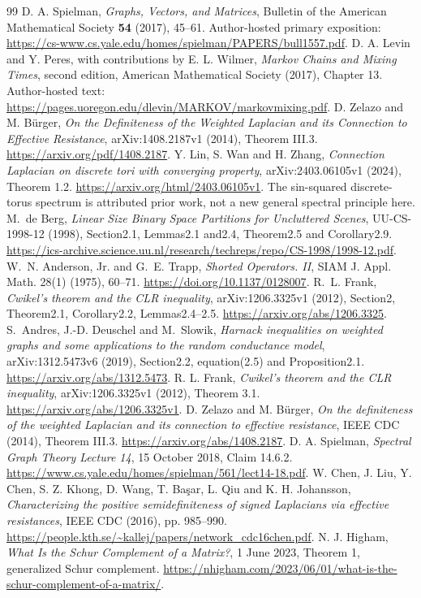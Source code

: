\documentclass[11pt]{article}
\begin{document}
\begin{thebibliography}{99}
 D. A. Spielman, \emph{Graphs, Vectors, and Matrices},
Bulletin of the American Mathematical Society \textbf{54} (2017), 45--61.
Author-hosted primary exposition:
\url{https://cs-www.cs.yale.edu/homes/spielman/PAPERS/bull1557.pdf}.
 D. A. Levin and Y. Peres, with contributions by
E. L. Wilmer, \emph{Markov Chains and Mixing Times}, second edition,
American Mathematical Society (2017), Chapter 13.
Author-hosted text: \url{https://pages.uoregon.edu/dlevin/MARKOV/markovmixing.pdf}.
 D. Zelazo and M. B{\"u}rger,
\emph{On the Definiteness of the Weighted Laplacian and its Connection to
Effective Resistance}, arXiv:1408.2187v1 (2014), Theorem III.3.
\url{https://arxiv.org/pdf/1408.2187}.
 Y. Lin, S. Wan and H. Zhang,
\emph{Connection Laplacian on discrete tori with converging property},
arXiv:2403.06105v1 (2024), Theorem 1.2.
\url{https://arxiv.org/html/2403.06105v1}.
The sin-squared discrete-torus spectrum is attributed prior work, not a new
general spectral principle here.
 M.~de Berg, \emph{Linear Size Binary Space Partitions for
Uncluttered Scenes}, UU-CS-1998-12 (1998), Section2.1, Lemmas2.1 and2.4,
Theorem2.5 and Corollary2.9.
\url{https://ics-archive.science.uu.nl/research/techreps/repo/CS-1998/1998-12.pdf}.
 W.~N. Anderson, Jr. and G.~E. Trapp,
\emph{Shorted Operators. II}, SIAM J. Appl. Math. 28(1) (1975), 60--71.
\url{https://doi.org/10.1137/0128007}.
 R.~L. Frank, \emph{Cwikel's theorem and the CLR inequality},
arXiv:1206.3325v1 (2012), Section2, Theorem2.1, Corollary2.2, Lemmas2.4--2.5.
\url{https://arxiv.org/abs/1206.3325}.
 S.~Andres, J.-D. Deuschel and M.~Slowik,
\emph{Harnack inequalities on weighted graphs and some applications to the random
conductance model}, arXiv:1312.5473v6 (2019), Section2.2, equation(2.5) and Proposition2.1.
\url{https://arxiv.org/abs/1312.5473}.
 R. L. Frank, \emph{Cwikel's theorem and the CLR inequality},
arXiv:1206.3325v1 (2012), Theorem 3.1.
\url{https://arxiv.org/abs/1206.3325v1}.
 D. Zelazo and M. B\"urger, \emph{On the definiteness of the
weighted Laplacian and its connection to effective resistance},
IEEE CDC (2014), Theorem III.3.
\url{https://arxiv.org/abs/1408.2187}.
 D. A. Spielman, \emph{Spectral Graph Theory Lecture 14},
15 October 2018, Claim 14.6.2.
\url{https://www.cs.yale.edu/homes/spielman/561/lect14-18.pdf}.
 W. Chen, J. Liu, Y. Chen, S. Z. Khong, D. Wang,
T. Ba\c{s}ar, L. Qiu and K. H. Johansson, \emph{Characterizing the positive
semidefiniteness of signed Laplacians via effective resistances},
IEEE CDC (2016), pp. 985--990.
\url{https://people.kth.se/~kallej/papers/network_cdc16chen.pdf}.
 N. J. Higham, \emph{What Is the Schur Complement of a Matrix?}, 1 June 2023, Theorem 1, generalized Schur complement. \url{https://nhigham.com/2023/06/01/what-is-the-schur-complement-of-a-matrix/}.


\end{thebibliography}
\end{document}
